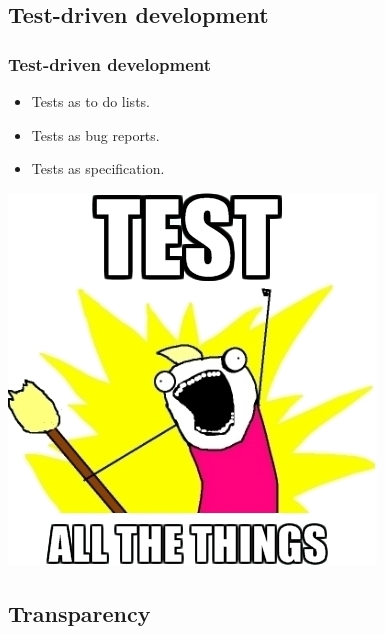 \documentclass[12pt,compress,english,utf8,t]{beamer}
\begin{document}
\subsection{Test-driven development}

\begin{frame}\frametitle{Test-driven development}
  \begin{itemize}
    \item Tests as to do lists.
    \item Tests as bug reports.
    \item Tests as specification.
  \end{itemize}

  \begin{center}
    \includegraphics[scale=0.5]{images/test-all-the-things.jpeg}
  \end{center}
\end{frame}


\subsection{Transparency}
\end{document}
